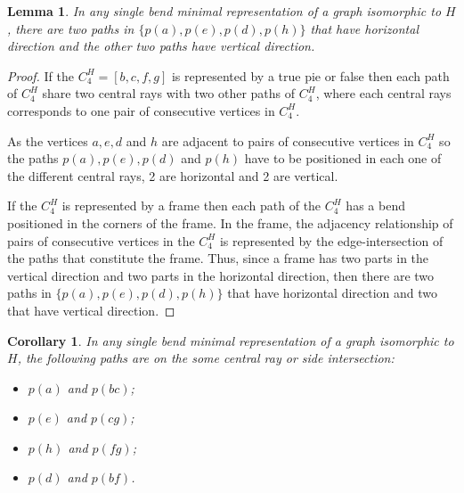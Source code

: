 \documentclass[preprint,12pt]{elsarticle} %
\newtheorem{lema}[theorem]{Lemma}
\newtheorem{coro}[theorem]{Corollary}
\begin{document}
\begin{lema}\label{lem:2vertical2horizontal}
In any single bend minimal representation of a graph isomorphic to $H$, there are two paths in $\{p(a), p(e), p(d), p(h) \}$ that have horizontal direction and the other two paths have vertical direction.
\end{lema}

\begin{proof}
If the $C_4^{H} = [b,c,f,g]$ is  represented by a true pie or false then each path of $C_4^{H}$ share two central rays with two other paths of $C_4^{H}$, where each central rays corresponds to one pair of consecutive vertices in $C_4^{H}$.

As the vertices $a, e, d $ and $ h$ are adjacent to pairs of consecutive vertices in $C_4^{H}$ so the paths $p(a), p(e), p(d)$ and $p(h)$ have to be positioned in each one of the different central rays,  2 are horizontal  and 2 are vertical.

If the $C_4^{H}$ is  represented by a frame then each path of the $C_4^{H}$ has a bend positioned in  the corners of the frame. In the frame, the adjacency relationship of pairs of consecutive vertices in the $C_4^{H}$ is represented by the edge-intersection of the paths that constitute the frame. Thus, since a frame has two parts in the vertical direction and two parts in the horizontal direction, then there are two paths in $\{p(a), p(e), p(d), p(h)\}$ that have horizontal direction and two that have vertical direction.
\end{proof}

\begin{coro} \label{coro:paresMesmoSegmento}
In any single bend minimal representation of a graph isomorphic to $H$, the following paths are on the some central ray or side intersection: %

\begin{itemize}
\item $p(a)$ and $p(bc)$;
\item $p(e)$ and $p(cg)$;
\item $p(h)$ and $p(fg)$;
\item $p(d)$ and $p(bf)$.
\end{itemize}
\end{coro}




\end{document}
